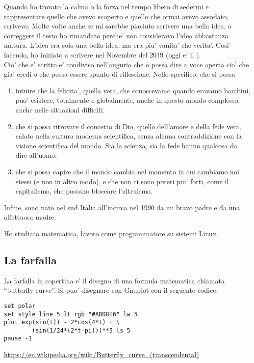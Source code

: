 Quando ho trovato la calma o la forza nel tempo libero di sedermi e rappresentare quello che avevo scoperto e quello che ormai avevo assodato, scrivevo. Molte volte anche se mi sarebbe piaciuto scrivere una bella idea, o correggere il testo ho rimandato perche' non consideravo l'idea abbastanza matura. L'idea era solo una bella idea, ma era piu' vanita' che verita'. Cosi' facendo, ho iniziato a scrivere nel Novembre del 2019 (oggi e' il \finishDate).\\
Cio' che e' scritto e' condiviso nell'augurio che o possa dire a voce aperta cio' che gia' credi o che possa essere spunto di riflessione. Nello specifico, che si possa 
\begin{enumerate}
    \item intuire che la felicita', quella vera, che conoscevamo quando eravamo bambini, puo' esistere, totalmente e globalmente, anche in questo mondo complesso, anche nelle situazioni difficili;
    \item che si possa ritrovare il concetto di Dio, quello dell'amore e della fede vera, calato nella cultura moderna scientifica, senza alcuna contraddizione con la visione scientifica del mondo. Sia la scienza, sia la fede hanno qualcosa da dire all'uomo;
    \item che si possa capire che il mondo cambia nel momento in cui cambiamo noi stessi (e non in altro modo), e che non ci sono poteri piu' forti, come il capitalismo, che possano bloccare l'altruismo.
\end{enumerate}

Infine, sono nato nel sud Italia all'incirca nel 1990 da un bravo padre e da una affettuosa madre.

Ho studiato matematica, lavoro come programmatore su sistemi Linux.

\subsection{La farfalla}

La farfalla in copertina e' il disegno di una formula matematica chiamata ``butterfly curve''. Si puo' disegnare con Gnuplot con il seguente codice:
\begin{verbatim}
set polar
set style line 5 lt rgb "#ADD8E6" lw 3
plot exp(sin(t)) - 2*cos(4*t) + \
        (sin(1/24*(2*t-pi)))**5 ls 5
pause -1
\end{verbatim}
\url{https://en.wikipedia.org/wiki/Butterfly\_curve\_(transcendental)}
